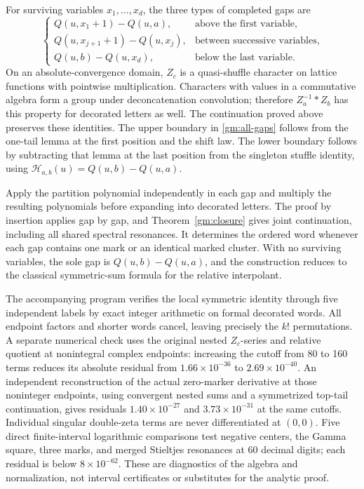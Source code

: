 For surviving variables \(x_1,\ldots,x_d\), the three types of
completed gaps are
\begin{equation}\label{gm:all-gaps}
 \begin{cases}
 Q(u,x_1+1)-Q(u,a),&\text{above the first variable},\\
 Q(u,x_{j+1}+1)-Q(u,x_j),&\text{between successive variables},\\
 Q(u,b)-Q(u,x_d),&\text{below the last variable}.
 \end{cases}
\end{equation}
On an absolute-convergence domain, $Z_c$ is a quasi-shuffle character
on lattice functions with pointwise multiplication. Characters with
values in a commutative algebra form a group under deconcatenation
convolution; therefore $Z_a^{-1}*Z_b$ has this property for decorated
letters as well. The continuation proved above preserves these
identities. The upper boundary in \eqref{gm:all-gaps} follows from the
one-tail lemma at the first position and the shift law. The lower
boundary follows by subtracting that lemma at the last position from
the singleton stuffle identity, using
$\mathcal H_{a,b}(u)=Q(u,b)-Q(u,a)$.

Apply the partition polynomial independently in each gap and multiply
the resulting polynomials before expanding into decorated letters.
The proof by insertion applies gap by gap, and
Theorem~\ref{gm:closure} gives joint continuation, including all shared
spectral resonances.  It determines the ordered word whenever each gap
contains one mark or an identical marked cluster.  With no surviving
variables, the sole gap is \(Q(u,b)-Q(u,a)\), and the construction
reduces to the classical symmetric-sum formula for the relative
interpolant.

The accompanying program verifies the local symmetric identity through
five independent labels by exact integer arithmetic on formal decorated
words.  All endpoint factors and shorter words cancel, leaving precisely
the \(k!\) permutations.  A separate numerical check uses the original
nested \(Z_c\)-series and relative quotient at nonintegral complex
endpoints: increasing the cutoff from 80 to 160 terms reduces its
absolute residual from \(1.66\times10^{-36}\) to
\(2.69\times10^{-40}\).  An independent reconstruction of the actual
zero-marker derivative at those noninteger endpoints, using convergent
nested sums and a symmetrized top-tail continuation, gives residuals
\(1.40\times10^{-27}\) and \(3.73\times10^{-31}\) at the same
cutoffs.  Individual singular double-zeta terms are never differentiated
at \((0,0)\).  Five direct finite-interval logarithmic
comparisons test negative centers, the Gamma square, three marks, and
merged Stieltjes resonances at 60 decimal digits; each residual is below
\(8\times10^{-62}\).  These are diagnostics of the algebra and
normalization, not interval certificates or substitutes for the
analytic proof.

